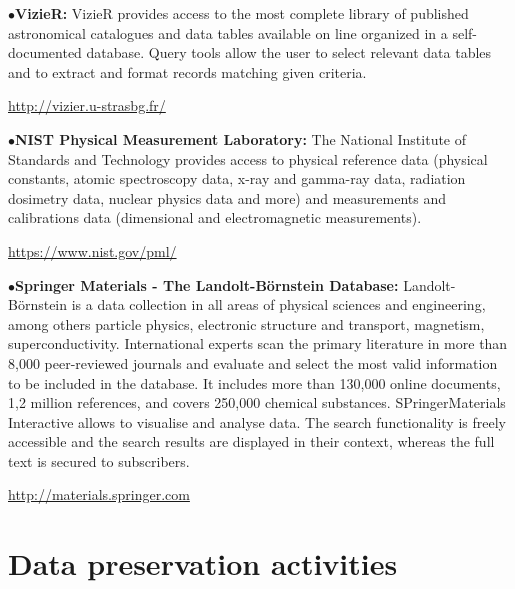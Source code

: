 \medskip

\item{$\bullet$}{\bf VizieR:}
VizieR provides access to the most complete library of published astronomical catalogues and data tables available on line organized in a self-documented database. Query tools allow the user to select relevant data tables and to extract and format records matching given criteria.
	\item{}\qquad\url{http://vizier.u-strasbg.fr/}


\medskip
{}

\medskip

\item{$\bullet$}{\bf NIST Physical Measurement Laboratory:} 
The National Institute of Standards and Technology provides access to physical reference data (physical constants, atomic spectroscopy data, x-ray and gamma-ray data, radiation dosimetry data, nuclear physics data and more) and measurements and calibrations data (dimensional and electromagnetic measurements).
	\item{}\qquad\url{https://www.nist.gov/pml/}

\medskip

\item{$\bullet$}{\bf Springer Materials  - The Landolt-B\"ornstein Database:}
Landolt-B\"ornstein is a data collection in all areas of physical sciences and engineering, among others particle physics, electronic structure and transport, magnetism, superconductivity. International experts scan the primary literature in more than 8,000 peer-reviewed journals and evaluate and select the most valid information to be included in the database. It includes more than 130,000 online documents, 1,2 million references, and covers 250,000 chemical substances. SPringerMaterials Interactive allows to visualise and analyse data.
The search functionality is freely accessible and the search results are displayed in their context, whereas the full text is secured to subscribers.
	\item{}\qquad\url{http://materials.springer.com}


\section{Data preservation activities}  %

\medskip


